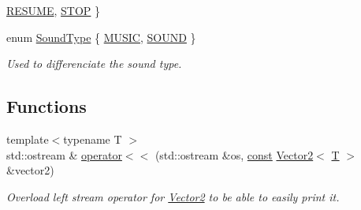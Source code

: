 \begin{DoxyCompactItemize}
\hyperlink{namespacearcade_a31ef30225775697d1aeaf59819ac5051aa20791f727f3fda515c60d07eab5c54f}{R\-E\-S\-U\-M\-E}, 
\hyperlink{namespacearcade_a31ef30225775697d1aeaf59819ac5051aab3ad1f71d947ba49406609ac00a904e}{S\-T\-O\-P}
 \}
\item 
enum \hyperlink{namespacearcade_a3bb4743a2eea59f3927e404e6549cae5}{Sound\-Type} \{ \hyperlink{namespacearcade_a3bb4743a2eea59f3927e404e6549cae5a5a4967c8f21ad70ba0e0459a0add50f0}{M\-U\-S\-I\-C}, 
\hyperlink{namespacearcade_a3bb4743a2eea59f3927e404e6549cae5a37f1d8b7897a8b789c2dd953b53416ef}{S\-O\-U\-N\-D}
 \}
\begin{DoxyCompactList}\small\item\em Used to differenciate the sound type. \end{DoxyCompactList}\end{DoxyCompactItemize}
\subsection*{Functions}
\begin{DoxyCompactItemize}
\item 
{\footnotesize template$<$typename T $>$ }\\std\-::ostream \& \hyperlink{namespacearcade_ac026dd84bbbe684ee613c202277e327b}{operator$<$$<$} (std\-::ostream \&os, \hyperlink{term__entry_8h_a57bd63ce7f9a353488880e3de6692d5a}{const} \hyperlink{structarcade_1_1_vector2}{Vector2}$<$ \hyperlink{curses_8priv_8h_a5ef253115820acf7d27f3c5c3b02a0f0}{T} $>$ \&vector2)
\begin{DoxyCompactList}\small\item\em Overload left stream operator for \hyperlink{structarcade_1_1_vector2}{Vector2} to be able to easily print it. \end{DoxyCompactList}\end{DoxyCompactItemize}


